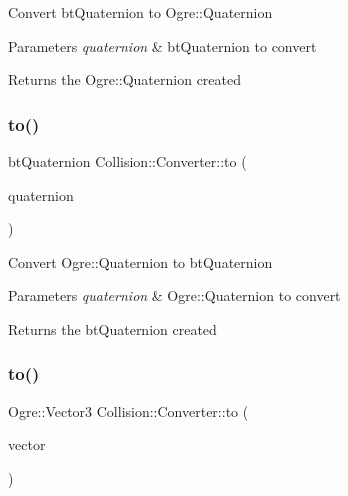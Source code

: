 Convert bt\+Quaternion to Ogre\+::\+Quaternion 
\begin{DoxyParams}{Parameters}
{\em quaternion} & bt\+Quaternion to convert \\
\hline
\end{DoxyParams}
\begin{DoxyReturn}{Returns}
the Ogre\+::\+Quaternion created 
\end{DoxyReturn}
\mbox{\label{class_collision_1_1_converter_a0ed727c0a2fa4df0409cf0f7e98fe7ce}} 
\subsubsection{\texorpdfstring{to()}{to()}\hspace{0.1cm}{\footnotesize\ttfamily [4/6]}}
{\footnotesize\ttfamily bt\+Quaternion Collision\+::\+Converter\+::to (\begin{DoxyParamCaption}\item[{const Ogre\+::\+Quaternion \&}]{quaternion }\end{DoxyParamCaption})\hspace{0.3cm}{\ttfamily [static]}}

Convert Ogre\+::\+Quaternion to bt\+Quaternion 
\begin{DoxyParams}{Parameters}
{\em quaternion} & Ogre\+::\+Quaternion to convert \\
\hline
\end{DoxyParams}
\begin{DoxyReturn}{Returns}
the bt\+Quaternion created 
\end{DoxyReturn}
\mbox{\label{class_collision_1_1_converter_a55c293e2329b62d00c6bd295142b7671}} 
\subsubsection{\texorpdfstring{to()}{to()}\hspace{0.1cm}{\footnotesize\ttfamily [5/6]}}
{\footnotesize\ttfamily Ogre\+::\+Vector3 Collision\+::\+Converter\+::to (\begin{DoxyParamCaption}\item[{const bt\+Vector3 \&}]{vector }\end{DoxyParamCaption})\hspace{0.3cm}{\ttfamily [static]}}

